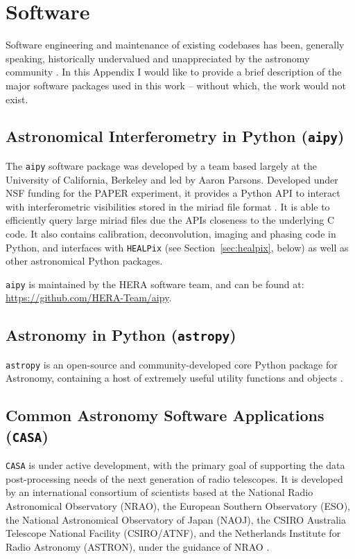 \chapter{Software}

Software engineering and maintenance of existing codebases has been, generally speaking, historically undervalued and unappreciated by the astronomy community \citep{AstropyProblem}. In this Appendix I would like to provide a brief description of the major software packages used in this work -- without which, the work would not exist.

\section{Astronomical Interferometry in Python ({\tt aipy})}
\label{sec:aipy}

The {\tt aipy} software package \citep{aipy} was developed by a team based largely at the University of California, Berkeley and led by Aaron Parsons. Developed under NSF funding for the PAPER experiment, it provides a Python API to interact with interferometric visibilities stored in the {\sc miriad} file format \citep{miriad}. It is able to efficiently query large {\sc miriad} files due the APIs closeness to the underlying C code. It also contains calibration, deconvolution, imaging and phasing code in Python, and interfaces with {\tt HEALPix} (see Section~\ref{sec:healpix}, below) as well as other astronomical Python packages.

{\tt aipy} is maintained by the HERA software team, and can be found at: \url{https://github.com/HERA-Team/aipy}.

\section{Astronomy in Python ({\tt astropy})}

{\tt astropy} is an open-source and community-developed core Python package for Astronomy, containing a host of extremely useful utility functions and objects \citep{astropy}.

\section{Common Astronomy Software Applications ({\tt CASA})}
\label{sec:casa}

{\tt CASA} is under active development, with the primary goal of supporting the data post-processing needs of the next generation of radio telescopes. It is developed by an international consortium of scientists based at the National Radio Astronomical Observatory (NRAO), the European Southern Observatory (ESO), the National Astronomical Observatory of Japan (NAOJ), the CSIRO Australia Telescope National Facility (CSIRO/ATNF), and the Netherlands Institute for Radio Astronomy (ASTRON), under the guidance of NRAO \citep{casa}.

